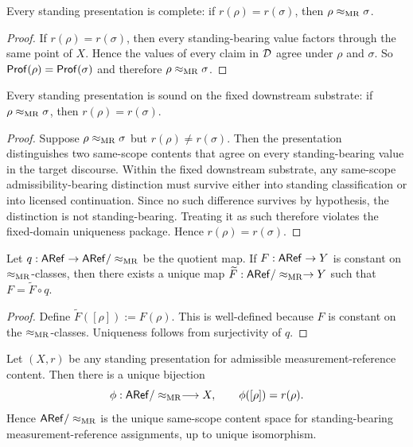 \begin{lemma}
\label{lem:appendix-complete}
Every standing presentation is complete: if $r(\rho)=r(\sigma)$, then $\rho\mathrel{\approx_{\mathrm{MR}}}\sigma$.
\end{lemma}

\begin{proof}
If $r(\rho)=r(\sigma)$, then every standing-bearing value factors through the same point of $X$.
Hence the values of every claim in $\mathcal{D}$ agree under $\rho$ and $\sigma$. So
$\mathsf{Prof}(\rho)=\mathsf{Prof}(\sigma)$ and therefore $\rho\mathrel{\approx_{\mathrm{MR}}}\sigma$.
\end{proof}

\begin{lemma}
\label{lem:appendix-sound}
Every standing presentation is sound on the fixed downstream substrate: if $\rho\mathrel{\approx_{\mathrm{MR}}}\sigma$, then
$r(\rho)=r(\sigma)$.
\end{lemma}

\begin{proof}
Suppose $\rho\mathrel{\approx_{\mathrm{MR}}}\sigma$ but $r(\rho)\neq r(\sigma)$. Then the presentation distinguishes two
same-scope contents that agree on every standing-bearing value in the target discourse. Within the
fixed downstream substrate, any same-scope admissibility-bearing distinction must survive either into
standing classification or into licensed continuation. Since no such difference survives by hypothesis,
the distinction is not standing-bearing. Treating it as such therefore violates the fixed-domain
uniqueness package. Hence $r(\rho)=r(\sigma)$.
\end{proof}

\begin{lemma}
\label{lem:appendix-q-up}
Let $q:\mathsf{ARef}\to\mathsf{ARef}/\mathrel{\approx_{\mathrm{MR}}}$ be the quotient map. If $F:\mathsf{ARef}\to Y$ is constant on $\mathrel{\approx_{\mathrm{MR}}}$-classes,
then there exists a unique map $\widetilde F:\mathsf{ARef}/\mathrel{\approx_{\mathrm{MR}}}\to Y$ such that $F=\widetilde F\circ q$.
\end{lemma}

\begin{proof}
Define $\widetilde F([\rho]) := F(\rho)$. This is well-defined because $F$ is constant on the
$\mathrel{\approx_{\mathrm{MR}}}$-classes. Uniqueness follows from surjectivity of $q$.
\end{proof}

\begin{theorem}
\label{thm:appendix-quotient-uniqueness}
Let $(X,r)$ be any standing presentation for admissible measurement-reference content. Then there is
a unique bijection
\[
\phi:\mathsf{ARef}/\mathrel{\approx_{\mathrm{MR}}}\longrightarrow X,
\qquad
\phi([\rho])=r(\rho).
\]
Hence $\mathsf{ARef}/\mathrel{\approx_{\mathrm{MR}}}$ is the unique same-scope content space for standing-bearing
measurement-reference assignments, up to unique isomorphism.
\end{theorem}

